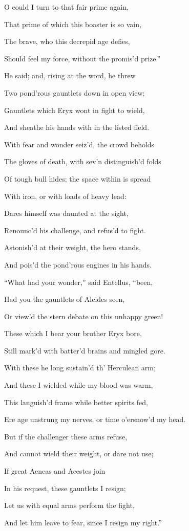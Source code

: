 O could I turn to that fair prime again,

That prime of which this boaster is so vain,

The brave, who this decrepid age defies,

Should feel my force, without the promis’d prize.”

He said; and, rising at the word, he threw

Two pond’rous gauntlets down in open view;

Gauntlets which Eryx wont in fight to wield,

And sheathe his hands with in the listed field.

With fear and wonder seiz’d, the crowd beholds

The gloves of death, with sev’n distinguish’d folds

Of tough bull hides; the space within is spread

With iron, or with loads of heavy lead:

Dares himself was daunted at the sight,

Renounc’d his challenge, and refus’d to fight.

Astonish’d at their weight, the hero stands,

And pois’d the pond’rous engines in his hands.

“What had your wonder,” said Entellus, “been,

Had you the gauntlets of Alcides seen,

Or view’d the stern debate on this unhappy green!

These which I bear your brother Eryx bore,

Still mark’d with batter’d brains and mingled gore.

With these he long sustain’d th’ Herculean arm;

And these I wielded while my blood was warm,

This languish’d frame while better spirits fed,

Ere age unstrung my nerves, or time o’ersnow’d my head.

But if the challenger these arms refuse,

And cannot wield their weight, or dare not use;

If great Aeneas and Acestes join

In his request, these gauntlets I resign;

Let us with equal arms perform the fight,

And let him leave to fear, since I resign my right.”

